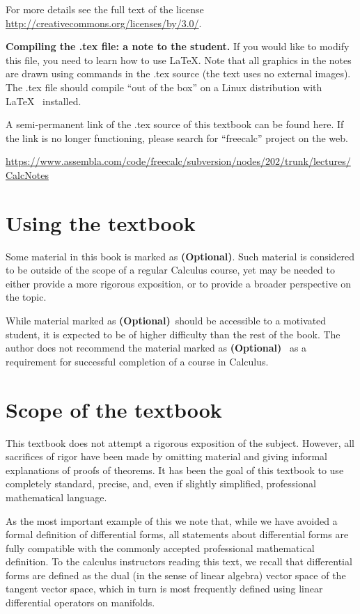 \documentclass[12pt]{book}
\newcommand{\optionalMaterial}{\textbf{(Optional)}}
\begin{document}
For more details see the full text of the license \url{http://creativecommons.org/licenses/by/3.0/}.

\noindent \textbf{Compiling the .tex file: a note to the student.} If you would like to modify this file, you need to learn how to use \LaTeX. Note that all graphics in the notes are drawn using commands in the .tex source (the text uses no external images). The .tex file should compile ``out of the box'' on a Linux distribution with \LaTeX~ installed.

A semi-permanent link of the .tex source of this textbook can be found here. If the link is no longer functioning, please search for ``freecalc'' project on the web.

\url{https://www.assembla.com/code/freecalc/subversion/nodes/202/trunk/lectures/CalcNotes}

\section*{Using the textbook}

Some material in this book is marked as \optionalMaterial. Such material is considered to be outside of the scope of a regular Calculus course, yet may be needed to either provide a more rigorous exposition, or to provide a broader perspective on the topic. 

While material marked as \optionalMaterial ~should be accessible to a motivated student, it is expected to be of higher difficulty than the rest of the book. The author does not recommend the material marked as \optionalMaterial ~ as a requirement for successful completion of a course in Calculus.

\section*{Scope of the textbook}
This textbook does not attempt a rigorous exposition of the subject. However, all sacrifices of rigor have been made by omitting material and giving informal explanations of proofs of theorems. It has been the goal of this textbook to use completely standard, precise, and, even if slightly simplified, professional mathematical language. 

As the most important example of this we note that, while we have avoided a formal definition of differential forms, all statements about differential forms are fully compatible with the commonly accepted professional mathematical definition. To the calculus instructors reading this text, we recall that differential forms are defined as the dual (in the sense of linear algebra) vector space of the tangent vector space, which in turn is most frequently defined using linear differential operators on manifolds.
\end{document}
